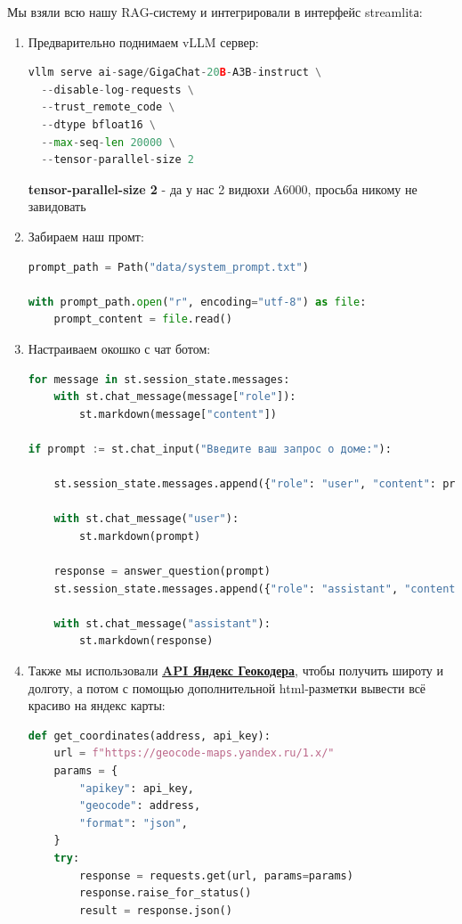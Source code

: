 \documentclass{article}
\begin{document}
Мы взяли всю нашу RAG-систему и интегрировали в интерфейс streamlitа:
\begin{enumerate}
    \item Предварительно поднимаем vLLM сервер:
        \begin{lstlisting}[language=Python]
vllm serve ai-sage/GigaChat-20B-A3B-instruct \
  --disable-log-requests \
  --trust_remote_code \
  --dtype bfloat16 \
  --max-seq-len 20000 \
  --tensor-parallel-size 2
        \end{lstlisting}
    \textbf{tensor-parallel-size 2} - да у нас 2 видюхи A6000, просьба никому не завидовать
    \item Забираем наш промт:
        \begin{lstlisting}[language=Python]
prompt_path = Path("data/system_prompt.txt")

with prompt_path.open("r", encoding="utf-8") as file:
    prompt_content = file.read()
        \end{lstlisting}
\newpage
    \item Настраиваем окошко с чат ботом:
        \begin{lstlisting}[language=Python]
for message in st.session_state.messages:
    with st.chat_message(message["role"]):
        st.markdown(message["content"])

if prompt := st.chat_input("Введите ваш запрос о доме:"):
    
    st.session_state.messages.append({"role": "user", "content": prompt})

    with st.chat_message("user"):
        st.markdown(prompt)

    response = answer_question(prompt)
    st.session_state.messages.append({"role": "assistant", "content": response})

    with st.chat_message("assistant"):
        st.markdown(response)
        \end{lstlisting}
    \item Также мы использовали \textbf{\href{https://yandex.ru/dev/geocode/doc/ru/quickstart}{API Яндекс Геокодера}}, чтобы получить широту и долготу, а потом с помощью дополнительной html-разметки вывести всё красиво на яндекс карты:
        \begin{lstlisting}[language=Python]
def get_coordinates(address, api_key):
    url = f"https://geocode-maps.yandex.ru/1.x/"
    params = {
        "apikey": api_key,
        "geocode": address,
        "format": "json",
    }
    try:
        response = requests.get(url, params=params)
        response.raise_for_status()
        result = response.json()
        

\end{lstlisting}
\end{enumerate}
\end{document}
